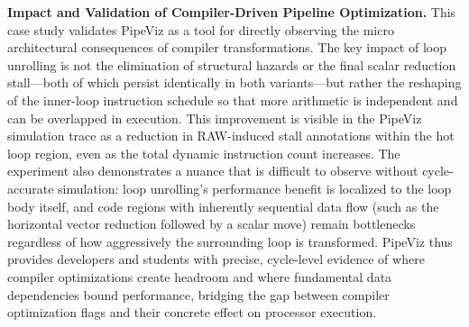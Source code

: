 \textbf{Impact and Validation of Compiler-Driven Pipeline Optimization.} This case study validates PipeViz as a tool for directly observing the micro architectural consequences of compiler transformations. The key impact of loop unrolling is not the elimination of structural hazards or the final scalar reduction stall---both of which persist identically in both variants---but rather the reshaping of the inner-loop instruction schedule so that more arithmetic is independent and can be overlapped in execution. This improvement is visible in the PipeViz simulation trace as a reduction in RAW-induced stall annotations within the hot loop region, even as the total dynamic instruction count increases. The experiment also demonstrates a nuance that is difficult to observe without cycle-accurate simulation: loop unrolling's performance benefit is localized to the loop body itself, and code regions with inherently sequential data flow (such as the horizontal vector reduction followed by a scalar move) remain bottlenecks regardless of how aggressively the surrounding loop is transformed. PipeViz thus provides developers and students with precise, cycle-level evidence of where compiler optimizations create headroom and where fundamental data dependencies bound performance, bridging the gap between compiler optimization flags and their concrete effect on processor execution.